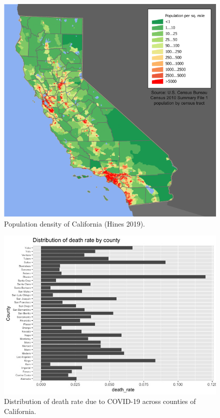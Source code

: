 \documentclass[11pt,twocolumn]{asaproc}
\begin{document}
\begin{figure}[t]
\centering\includegraphics[scale=.30]{density.png}
\caption{Population density of California (Hines 2019).}
\label{fig:density}
\end{figure}

\begin{figure}[t]
\centering\includegraphics[scale=.30]{death_rate.jpeg}
\caption{Distribution of death rate due to COVID-19 across counties of California.}
\label{fig:deathrate}
\end{figure}
\end{document}
